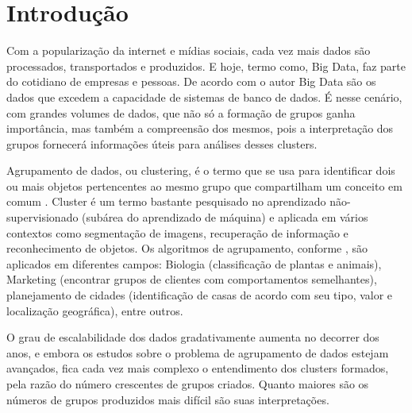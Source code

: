 

\chapter{Introdução} \label{cap:introd}

Com a popularização da internet e mídias sociais, cada vez mais dados são processados, transportados e produzidos. E hoje, termo como, Big Data, faz parte do cotidiano de empresas e pessoas. De acordo com o autor  Big Data são os dados que excedem a capacidade de sistemas de banco de dados. É nesse cenário, com grandes volumes de dados, que não só a formação de grupos ganha importância, mas também a compreensão dos mesmos, pois a interpretação dos grupos fornecerá informações úteis para análises desses clusters.

Agrupamento de dados, ou clustering, é o termo que se usa para identificar dois ou mais objetos pertencentes ao mesmo grupo que compartilham um conceito em comum \cite{Kumar2013}. Cluster é um termo bastante pesquisado no aprendizado não-supervisionado (subárea do aprendizado de máquina) e  aplicada em vários contextos como segmentação de imagens, recuperação de informação e reconhecimento de objetos. Os algoritmos de agrupamento, conforme , são aplicados em diferentes campos: Biologia (classificação de plantas e animais), Marketing (encontrar grupos de clientes com comportamentos semelhantes), planejamento de cidades (identificação de casas de acordo com seu tipo, valor e localização geográfica), entre outros.

O grau de escalabilidade dos dados gradativamente aumenta no decorrer dos anos, e embora os estudos sobre o problema de agrupamento de dados estejam avançados, fica cada vez mais complexo o entendimento dos clusters formados, pela razão do número crescentes de grupos criados. Quanto maiores são os números de grupos produzidos mais  difícil são suas interpretações. 

